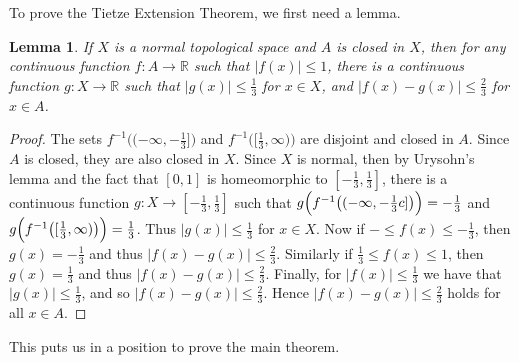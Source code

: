 \documentclass[12pt]{article}
\newtheorem{lemma}{Lemma}
\newcommand*{\abs}[1]{\left\lvert #1\right\rvert}
\begin{document}
To prove the Tietze Extension Theorem, we first need a lemma.

\begin{lemma}
If $X$ is a normal topological space and $A$ is closed in $X$, then for any continuous function $f\colon A\to\mathbb{R}$ such that $|f(x)|\leq 1$, there is a continuous function $g\colon X\to\mathbb{R}$ such that $\abs{g(x)}\leq\frac{1}{3}$ for $x\in X$, and $\abs{f(x)-g(x)}\leq\frac{2}{3}$ for $x\in A$.
\end{lemma}
\renewcommand{\proofname}{Proof} %
\begin{proof}
The sets $f^{-1}\bigl((-\infty,-\frac{1}{3}]\bigr)$ and $f^{-1}\bigl([\frac{1}{3},\infty)\bigr)$ are disjoint and closed in $A$. Since $A$ is closed, they are also closed in $X$. Since $X$ is normal, then by Urysohn's lemma and the fact that $[0,1]$ is homeomorphic to $[-\frac{1}{3},\frac{1}{3}]$, there is a continuous function $g\colon X\to[-\frac{1}{3},\frac{1}{3}]$ such that $g\Bigl(f^{-1}\bigl((-\infty,-\frac{1}{3}c]\bigr)\Bigr)=-\frac{1}{3}$ and $g\Bigl(f^{-1}\bigl([\frac{1}{3},\infty)\bigr)\Bigr)=\frac{1}{3}$. Thus $\abs{g(x)}\leq \frac{1}{3}$ for $x\in X$. Now if $-\leq f(x)\leq -\frac{1}{3}$, then $g(x)=-\frac{1}{3}$ and thus $\abs{f(x)-g(x)}\leq\frac{2}{3}$. Similarly if $\frac{1}{3}\leq f(x)\leq 1$, then $g(x)=\frac{1}{3}$ and thus $|f(x)-g(x)|\leq\frac{2}{3}$. Finally, for $\abs{f(x)}\leq \frac{1}{3}$ we have that $\abs{g(x)}\leq \frac{1}{3}$, and so $\abs{f(x)-g(x)}\leq\frac{2}{3}$. Hence $\abs{f(x)-g(x)}\leq\frac{2}{3}$ holds for all $x\in A$.
\end{proof}

This puts us in a position to prove the main theorem.
\end{document}
